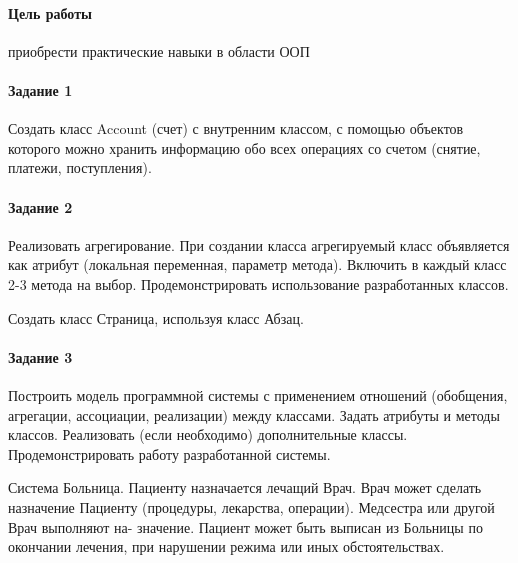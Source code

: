 \newcommand{\basefile}{../../src/ssp_po5/reports/Karnasevich/4/src/main4/}

\paragraph{Цель работы}
приобрести практические навыки в области ООП

\paragraph{Задание 1}
Создать класс Account (счет) с внутренним классом, с помощью объектов которого можно
хранить информацию обо всех операциях со счетом (снятие, платежи, поступления).






\paragraph{Задание 2}
Реализовать агрегирование.
При создании класса агрегируемый класс объявляется как атрибут (локальная переменная, параметр метода).
Включить в каждый класс 2-3 метода на выбор.
Продемонстрировать использование разработанных классов.

Создать класс Страница, используя класс Абзац.





\paragraph{Задание 3}
Построить модель программной системы с применением отношений (обобщения, агрегации, ассоциации, реализации)
между классами. Задать атрибуты и методы классов. Реализовать (если необходимо) дополнительные классы.
Продемонстрировать работу разработанной системы.

Система Больница. Пациенту назначается лечащий Врач. Врач может сделать назначение
Пациенту (процедуры, лекарства, операции). Медсестра или другой Врач выполняют на-
значение. Пациент может быть выписан из Больницы по окончании лечения, при нарушении
режима или иных обстоятельствах.







